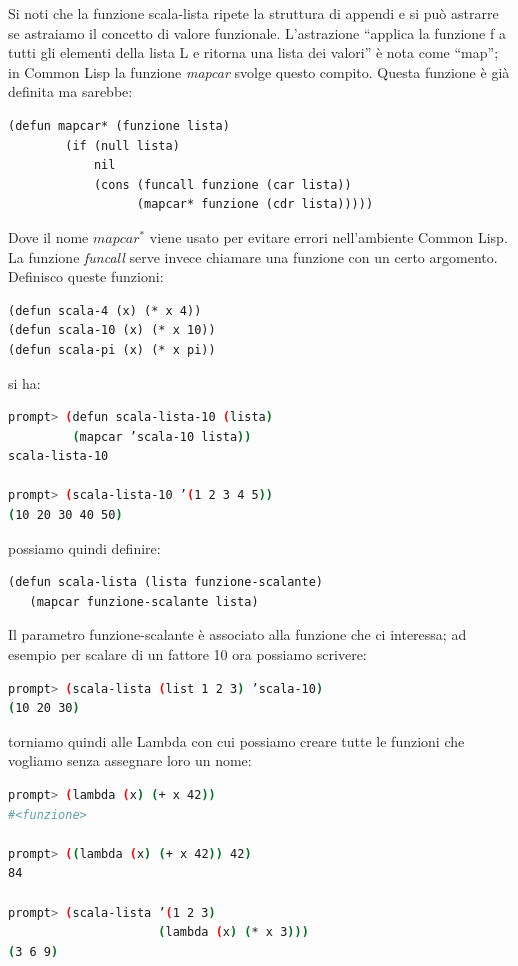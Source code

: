 \documentclass[a4paper,12pt, oneside]{book}
\begin{document}
Si noti che la funzione scala-lista ripete la struttura di appendi e si può astrarre se astraiamo il
concetto di valore funzionale. L’astrazione “applica la funzione f a tutti gli elementi della lista L e ritorna una
lista dei valori” è nota come “map”; in Common Lisp la funzione \textit{mapcar }svolge
questo compito. Questa funzione è già definita ma sarebbe:
\begin{verbatim}
(defun mapcar* (funzione lista)
        (if (null lista)
            nil
            (cons (funcall funzione (car lista))
                  (mapcar* funzione (cdr lista)))))
\end{verbatim}
Dove il nome $mapcar^*$ viene usato per evitare errori nell’ambiente Common Lisp. La funzione \textit{funcall} serve invece chiamare una funzione con un certo argomento.\\
Definisco queste funzioni:
\begin{verbatim}
(defun scala-4 (x) (* x 4))
(defun scala-10 (x) (* x 10))
(defun scala-pi (x) (* x pi))
\end{verbatim}
si ha:
\begin{shaded}
\begin{lstlisting}[language=bash]
prompt> (defun scala-lista-10 (lista)
         (mapcar ’scala-10 lista))
scala-lista-10

prompt> (scala-lista-10 ’(1 2 3 4 5))
(10 20 30 40 50)
\end{lstlisting}
\end{shaded}
possiamo quindi definire:
\begin{verbatim}
(defun scala-lista (lista funzione-scalante)
   (mapcar funzione-scalante lista)
\end{verbatim}
Il parametro funzione-scalante è associato alla funzione che ci interessa; ad esempio per scalare di un fattore 10 ora possiamo scrivere:
\begin{shaded}
\begin{lstlisting}[language=bash]
prompt> (scala-lista (list 1 2 3) ’scala-10)
(10 20 30)
\end{lstlisting}
\end{shaded}
torniamo quindi alle Lambda con cui possiamo creare tutte le funzioni che
vogliamo senza assegnare loro un nome:
\begin{shaded}
\begin{lstlisting}[language=bash]
prompt> (lambda (x) (+ x 42))
#<funzione>

prompt> ((lambda (x) (+ x 42)) 42)
84

prompt> (scala-lista ’(1 2 3)
                     (lambda (x) (* x 3)))
(3 6 9)
\end{lstlisting}
\end{shaded}
\end{document}
